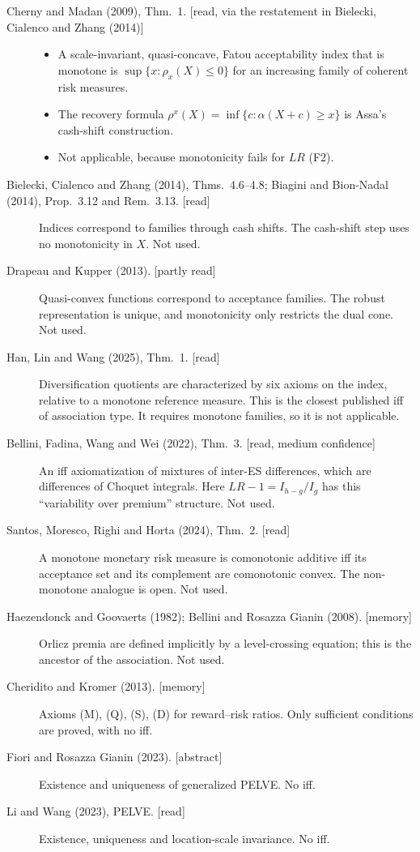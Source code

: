 \begin{description}
\item[Cherny and Madan (2009), Thm.~1. {[read, via the restatement in Bielecki, Cialenco and Zhang (2014)]}]
  \begin{itemize}
  \item A scale-invariant, quasi-concave, Fatou acceptability index that is monotone is $\sup\{x:\rho_x(X)\le 0\}$ for an increasing family of coherent risk measures.
  \item The recovery formula $\rho^x(X)=\inf\{c:\alpha(X+c)\ge x\}$ is Assa's cash-shift construction.
  \item Not applicable, because monotonicity fails for $LR$ (F2).
  \end{itemize}
\item[Bielecki, Cialenco and Zhang (2014), Thms.~4.6--4.8; Biagini and Bion-Nadal (2014), Prop.~3.12 and Rem.~3.13. {[read]}] Indices correspond to families through cash shifts. The cash-shift step uses no monotonicity in $X$. Not used.
\item[Drapeau and Kupper (2013). {[partly read]}] Quasi-convex functions correspond to acceptance families. The robust representation is unique, and monotonicity only restricts the dual cone. Not used.
\item[Han, Lin and Wang (2025), Thm.~1. {[read]}] Diversification quotients are characterized by six axioms on the index, relative to a monotone reference measure. This is the closest published iff of association type. It requires monotone families, so it is not applicable.
\item[Bellini, Fadina, Wang and Wei (2022), Thm.~3. {[read, medium confidence]}] An iff axiomatization of mixtures of inter-ES differences, which are differences of Choquet integrals. Here $LR-1=I_{h-g}/I_g$ has this ``variability over premium'' structure. Not used.
\item[Santos, Moresco, Righi and Horta (2024), Thm.~2. {[read]}] A monotone monetary risk measure is comonotonic additive iff its acceptance set and its complement are comonotonic convex. The non-monotone analogue is open. Not used.
\item[Haezendonck and Goovaerts (1982); Bellini and Rosazza Gianin (2008). {[memory]}] Orlicz premia are defined implicitly by a level-crossing equation; this is the ancestor of the association. Not used.
\item[Cheridito and Kromer (2013). {[memory]}] Axioms (M), (Q), (S), (D) for reward--risk ratios. Only sufficient conditions are proved, with no iff.
\item[Fiori and Rosazza Gianin (2023). {[abstract]}] Existence and uniqueness of generalized PELVE. No iff.
\item[Li and Wang (2023), PELVE. {[read]}] Existence, uniqueness and location-scale invariance. No iff.
\end{description}

